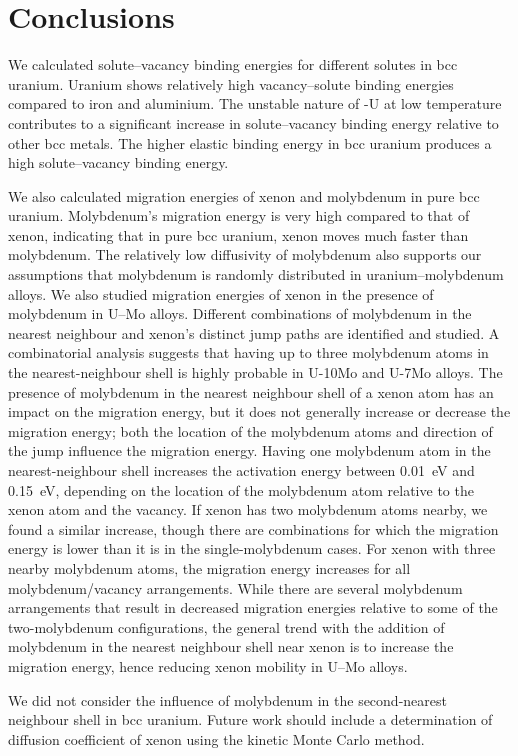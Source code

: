 \section{Conclusions}
We calculated solute--vacancy binding energies for different solutes in bcc
uranium. Uranium shows relatively high vacancy--solute binding energies compared to iron and aluminium. The unstable nature of \textgamma-U at low temperature contributes to a significant increase in solute--vacancy binding energy relative to other bcc metals. The higher elastic binding energy in bcc uranium produces a high solute--vacancy binding energy.

We also calculated migration energies of xenon and molybdenum in pure bcc
uranium. Molybdenum's migration energy is very high compared to that of xenon,
indicating that in pure bcc uranium, xenon moves much faster than molybdenum.
The relatively low diffusivity of molybdenum also supports our assumptions that molybdenum is randomly distributed in uranium--molybdenum alloys.
We also studied migration energies of xenon in the presence of molybdenum in
\mbox{U--Mo} alloys.
Different combinations of molybdenum in the nearest neighbour and xenon's
distinct jump paths are identified and studied.
A combinatorial analysis suggests that having up to three molybdenum atoms in
the nearest-neighbour shell is highly probable in U-10Mo and U-7Mo alloys.
The presence of molybdenum in the nearest neighbour shell of a xenon atom has
an impact on the migration energy, but it does not generally increase or
decrease the migration energy; both the location of the molybdenum atoms and
direction of the jump influence the migration energy.
Having one molybdenum atom in the nearest-neighbour shell increases the
activation energy between 0.01~eV and 0.15~eV, depending on the location of
the molybdenum atom relative to the xenon atom and the vacancy.
If xenon has two molybdenum atoms nearby, we found a similar increase,
though there are combinations for which the migration energy is lower than it
is in the single-molybdenum cases.
For xenon with three nearby molybdenum atoms,
the migration energy increases for all molybdenum/\allowbreak{}vacancy
arrangements.
While there are several molybdenum arrangements that result in decreased
migration energies relative to some of the two-molybdenum configurations,
the general trend with the addition of molybdenum in the nearest neighbour
shell near xenon is to increase the migration energy, hence reducing xenon
mobility in \mbox{U--Mo} alloys.
 
We did not consider the influence of molybdenum in the second-nearest neighbour
shell in bcc uranium. Future work should include a determination of diffusion
coefficient of xenon using  the kinetic Monte Carlo method.


%




